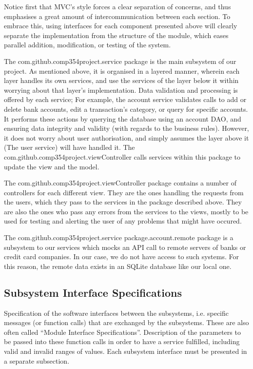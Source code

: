 \documentclass[12pt]{article}
\begin{document}
Notice first that MVC's style forces a clear separation of concerns, and thus emphasises a great amount of intercommunication between each section. To embrace this, using interfaces for each component presented above will clearly separate the implementation from the structure of the module, which eases parallel addition, modification, or testing of the system.

The com.github.comp354project.service package is the main subsystem of our project. As mentioned above, it is organised in a layered manner, wherein each layer handles its own services, and use the services of the layer below it within worrying about that layer's implementation. Data validation and processing is offered by each service; For example, the account service validates calls to add or delete bank accounts, edit a transaction's category, or query for specific accounts. It performs these actions by querying the database using an account DAO, and ensuring data integrity and validity (with regards to the business rules). However, it does not worry about user authorisation, and simply assumes the layer above it (The user service) will have handled it. The com.github.comp354project.viewController calls services within this package to update the view and the model.

The com.github.comp354project.viewController package contains a number of controllers for each different view. They are the ones handling the requests from the users, which they pass to the services in the package described above. They are also the ones who pass any errors from the services to the views, mostly to be used for testing and alerting the user of any problems that might have occured.

The com.github.comp354project.service package.account.remote package is a subsystem to our services which mocks an API call to remote servers of banks or credit card companies. In our case, we do not have access to such systems. For this reason, the remote data exists in an SQLite database like our local one.

\subsection{Subsystem Interface Specifications} \label{subsystem interface}

Specification of the software interfaces between the subsystems,
i.e. specific messages (or function calls) that are exchanged by the subsystems.
These are also often called ``Module Interface Specifications''.
Description of the parameters to be passed into these function calls in order to have a service fulfilled,
including valid and invalid ranges of values.
Each subsystem interface must be presented in a separate subsection.
\end{document}
